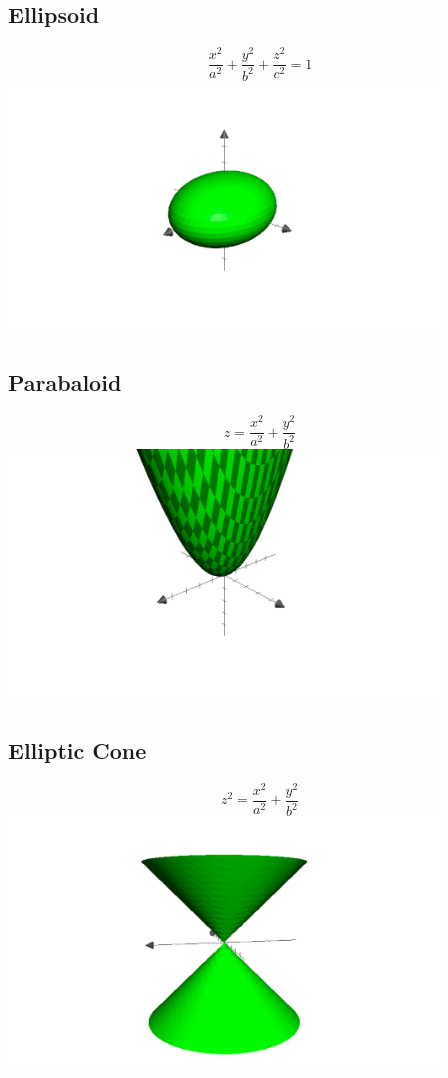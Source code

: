 \documentclass[10pt,letterpaper]{article}
\begin{document}
	\subsection{Ellipsoid}
	\[ \frac{x^2}{a^2}+\frac{y^2}{b^2}+\frac{z^2}{c^2} =1 \]
	\includegraphics[width=4.5in]{ellipsoid.pdf}
	\newpage
	
	\subsection{Parabaloid}
	\[  z = \frac{x^2}{a^2}+\frac{y^2}{b^2} 	\]
	\includegraphics[width=4.5in]{paraboloid.pdf}
		
	\subsection{Elliptic Cone}
	\[  z^2 = \frac{x^2}{a^2}+\frac{y^2}{b^2}	\]
	\includegraphics[width=4.5in]{ellipticcone.pdf}
	\newpage
	
\end{document}
